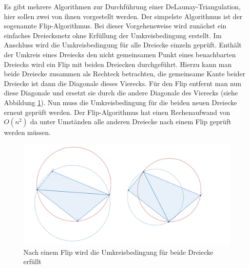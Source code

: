 \documentclass[10pt]{scrartcl}
\begin{document}
Es gibt mehrere Algorithmen zur Durchführung einer DeLaunay-Triangulation, hier sollen zwei von ihnen vorgestellt werden. Der simpelste Algorithmus ist der sogenannte Flip-Algorithmus. Bei dieser Vorgehensweise wird zunächst ein einfaches Dreiecksnetz ohne Erfüllung der Umkreisbedingung erstellt. Im Anschluss wird die Umkreisbedingung für alle Dreiecke einzeln geprüft. Enthält der Umkreis eines Dreiecks den nicht gemeinsamen Punkt eines benachbarten Dreiecks wird ein Flip mit beiden Dreiecken durchgeführt. Hierzu kann man beide Dreiecke zusammen als Rechteck betrachten, die gemeinsame Kante beider Dreiecke ist dann die Diagonale dieses Vierecks. Für den Flip entfernt man nun diese Diagonale und ersetzt sie durch die andere Diagonale des Vierecks (siehe Abbildung \ref{img:flip_algorithm}). Nun muss die Umkreisbedingung für die beiden neuen Dreiecke erneut geprüft werden. Der Flip-Algorithmus hat einen Rechenaufwand von $O(n^2)$ da unter Umständen alle anderen Dreiecke nach einem Flip geprüft werden müssen.

\begin{figure}
\centering
\includegraphics[scale=0.3]{images/flip_algorithm.jpg}
\caption{\label{img:flip_algorithm}Nach einem Flip wird die Umkreisbedingung für beide Dreiecke erfüllt}
\end{figure}
\end{document}
